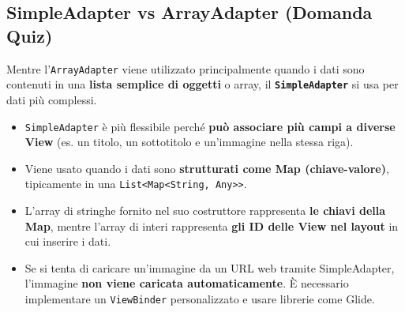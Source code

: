\begin{center}
\end{center}

\subsection{SimpleAdapter vs ArrayAdapter (Domanda Quiz)}
Mentre l'\texttt{ArrayAdapter} viene utilizzato principalmente quando i dati sono contenuti in una
\textbf{lista semplice di oggetti} o array, il \textbf{\texttt{SimpleAdapter}} si usa per dati più complessi.
\begin{itemize}
    \item \texttt{SimpleAdapter} è più flessibile perché \textbf{può associare più campi a diverse View} (es. un titolo, un sottotitolo e un'immagine nella stessa riga).
    \item Viene usato quando i dati sono \textbf{strutturati come Map (chiave-valore)}, tipicamente in una \texttt{List<Map<String, Any>>}.
    \item L'array di stringhe fornito nel suo costruttore rappresenta \textbf{le chiavi della Map}, mentre l'array di interi rappresenta \textbf{gli ID delle View nel layout} in cui inserire i dati.
    \item Se si tenta di caricare un'immagine da un URL web tramite SimpleAdapter, l'immagine \textbf{non viene caricata automaticamente}.
    È necessario implementare un \texttt{ViewBinder} personalizzato e usare librerie come Glide.
\end{itemize}

